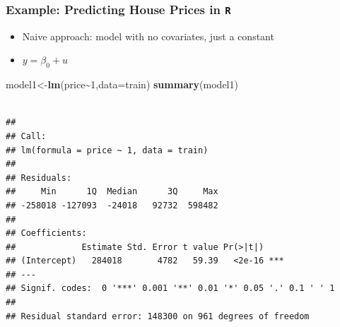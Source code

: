 \documentclass[
  shownotes,
  xcolor={svgnames},
  hyperref={colorlinks,citecolor=DarkBlue,linkcolor=DarkRed,urlcolor=DarkBlue}
  , aspectratio=169]{beamer}
\newenvironment{Shaded}{\begin{snugshade}}{\end{snugshade}}
\newcommand{\DataTypeTok}[1]{\textcolor[rgb]{0.13,0.29,0.53}{#1}}
\newcommand{\DecValTok}[1]{\textcolor[rgb]{0.00,0.00,0.81}{#1}}
\newcommand{\KeywordTok}[1]{\textcolor[rgb]{0.13,0.29,0.53}{\textbf{#1}}}
\newcommand{\NormalTok}[1]{#1}
\newcommand{\OperatorTok}[1]{\textcolor[rgb]{0.81,0.36,0.00}{\textbf{#1}}}
\begin{document}
\begin{frame}[fragile]
\frametitle{Example: Predicting House Prices in \texttt{R}}

\begin{itemize}
 \item Naive approach: model with no covariates, just a constant
 \item $y = \beta_0 + u$
\end{itemize}

\begin{Shaded}
\footnotesize
\begin{Highlighting}[]

\NormalTok{model1\textless{}{-}}\KeywordTok{lm}\NormalTok{(price}\OperatorTok{\textasciitilde{}}\DecValTok{1}\NormalTok{,}\DataTypeTok{data=}\NormalTok{train)}
\KeywordTok{summary}\NormalTok{(model1)}
\end{Highlighting}
\end{Shaded}

\begin{tiny}
\begin{verbatim}

## 
## Call:
## lm(formula = price ~ 1, data = train)
## 
## Residuals:
##     Min      1Q  Median      3Q     Max 
## -258018 -127093  -24018   92732  598482 
## 
## Coefficients:
##             Estimate Std. Error t value Pr(>|t|)    
## (Intercept)   284018       4782   59.39   <2e-16 ***
## ---
## Signif. codes:  0 '***' 0.001 '**' 0.01 '*' 0.05 '.' 0.1 ' ' 1
## 
## Residual standard error: 148300 on 961 degrees of freedom
\end{verbatim}
\end{tiny}

\end{frame}
\end{document}
